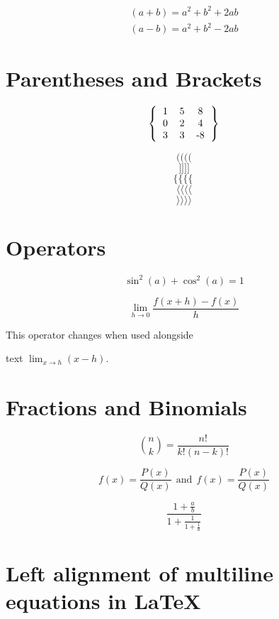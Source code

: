 \documentclass[]{article}
\begin{document}
\begin{gather*} 
	(a+b)=a^2+b^2+2ab \\ 
	(a-b)=a^2+b^2-2ab
\end{gather*}



\section{Parentheses and Brackets}



\[ 
\left \{
\begin{tabular}{ccc}
	1 & 5 & 8 \\
	0 & 2 & 4 \\
	3 & 3 & -8 
\end{tabular}
\right \}
\]



\newpage


\[ \big( \Big( \bigg( \Bigg( \]
\[ \big] \Big] \bigg] \Bigg] \]
\[ \big\{ \Big\{ \bigg\{ \Bigg\{\ \]
\[ \big \langle \Big \langle \bigg \langle  \Bigg \langle \]
\[ \big \rangle \Big \rangle \bigg \rangle  \Bigg \rangle \]



\section{Operators}


\[
\sin^2(a)+\cos^2(a) = 1
\]

\[
\lim_{h \rightarrow 0 } \frac{f(x+h)-f(x)}{h}
\]

This operator changes when used alongside 

text \( \lim_{x \rightarrow h} (x-h) \).


\section{Fractions and Binomials}

\[
\binom{n}{k} = \frac{n!}{k!(n-k)!}
\]

\[ f(x)=\frac{P(x)}{Q(x)} \ \ \textrm{and} 
\ \ f(x)=\textstyle\frac{P(x)}{Q(x)} \]

\[ \frac{1+\frac{a}{b}}{1+\frac{1}{1+\frac{1}{a}}} \]


\section{Left alignment of multiline equations in LaTeX}
\end{document}
